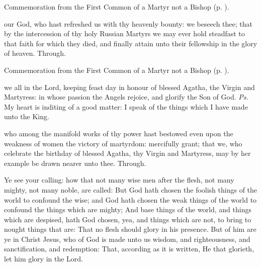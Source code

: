 \begin{rubric}
	Commemoration  from the First Common of a Martyr not a Bishop (p. \pageref{CommonMartyrNotBishopISecret}).
\end{rubric}


\postcommunion
{} our God, who hast refreshed us with thy heavenly bounty: we beseech thee; that by the intercession of thy holy Russian Martyrs we may ever hold steadfast to that faith for which they died, and finally attain unto their fellowship in the glory of heaven. Through.

\begin{rubric}
	Commemoration  from the First Common of a Martyr not a Bishop (p. \pageref{CommonMartyrNotBishopIPostcommunion}).
\end{rubric}


\clearpage
{}

\introit
{} we all in the Lord, keeping feast day in honour of blessed Agatha, the Virgin and Martyress: in whose passion the Angels rejoice, and glorify the Son of God. \textit{Ps.} My heart is inditing of a good matter: I speak of the things which I have made unto the King.

\collect
{} who among the manifold works of thy power hast bestowed even upon the weakness of women the victory of martyrdom: mercifully grant; that we, who celebrate the birthday of blessed Agatha, thy Virgin and Martyress, may by her example be drawn nearer unto thee. Through.

 Ye see your calling: how that not many wise men after the flesh, not many mighty, not many noble, are called: But God hath chosen the foolish things of the world to confound the wise; and God hath chosen the weak things of the world to confound the things which are mighty; And base things of the world, and things which are despised, hath God chosen, yea, and things which are not, to bring to nought things that are: That no flesh should glory in his presence. But of him are ye in Christ Jesus, who of God is made unto us wisdom, and righteousness, and sanctification, and redemption: That, according as it is written, He that glorieth, let him glory in the Lord.

